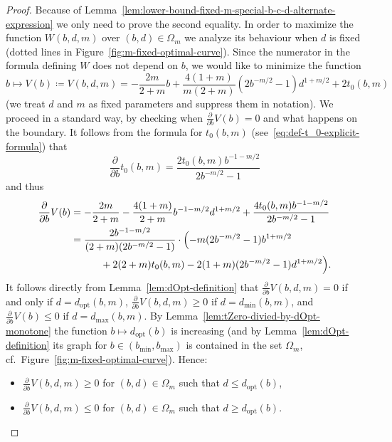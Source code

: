 \documentclass[a4paper]{amsart} %
\theoremstyle{definition}
\theoremstyle{remark}
\numberwithin{equation}{section}
\newcommand*{\specialbd}[1]{\Omega_{#1}}
\newcommand*{\XXXspecialbd}{W}
\newcommand*{\XXXspecialbdDenominator}{V}
\newcommand*{\bMin}{b_{\min}}
\newcommand*{\bMax}{b_{\max}}
\newcommand*{\dMin}{d_{\min}}
\newcommand*{\dMax}{d_{\max}}
\newcommand*{\dOpt}{d_{\mathrm{opt}}}
\begin{document}
\begin{proof}%
	Because of Lemma~\ref{lem:lower-bound-fixed-m-special-b-c-d-alternate-expression}
	we only need to prove the second equality.
	In order to maximize the function $\XXXspecialbd(b,d,m)$
	over $(b,d) \in \specialbd{m}$
	we analyze its behaviour when $d$ is fixed
	(dotted lines in Figure~\ref{fig:m-fixed-optimal-curve}).
	Since the numerator in the formula defining $\XXXspecialbd$ does not depend on $b$,
	we would like to  minimize the function 
	\[
	b \mapsto \XXXspecialbdDenominator(b) \coloneqq \XXXspecialbdDenominator(b,d,m) = - \frac{2m}{2+m}b +
	\frac{4(1+m)}{m(2+m)}(2b^{-m/2}  -1)d^{1+m/2} 
	+2t_0(b,m)
	\]
	(we treat $d$ and $m$ as fixed parameters and suppress them in notation).
	We proceed in a standard way, by checking when $\frac{\partial }{\partial b} \XXXspecialbdDenominator(b) = 0$ and what happens on the boundary.
	It follows from the formula for $t_0(b,m)$ (see~\eqref{eq:def-t_0-explicit-formula})
	that
	\[
	\frac{\partial}{\partial b} t_0(b,m) = \frac{2t_0(b,m) b^{-1-m/2}}{2 b^{-m/2} -1 }
	\]
	and thus
	\begin{align*}
	\frac{\partial}{\partial b} \XXXspecialbdDenominator(b)
	&= - \frac{2m}{2+m}
	- \frac{4(1+m)}{2+m}b^{-1-m/2}  d^{1+m/2} 
	+\frac{4t_0(b,m) b^{-1-m/2}}{2 b^{-m/2} -1 }\\
	&=   \frac{2b^{-1-m/2} 
	}{(2+m)(2 b^{-m/2} -1)}
	\cdot
	\Bigl( 
	-m(2 b^{-m/2} -1)b^{1+m/2} \\
	&\qquad\quad +2(2+m) t_0(b,m) - 2(1+m)(2 b^{-m/2} -1)d^{1+m/2}	\Bigr).
	\end{align*}		
	It follows directly from Lemma~\ref{lem:dOpt-definition} that
	$\frac{\partial }{\partial b} \XXXspecialbdDenominator(b,d,m) =0 $ if and only if  $d=\dOpt(b,m)$,
	$\frac{\partial }{\partial b} \XXXspecialbdDenominator(b,d,m) \geq 0$
	if $d = \dMin(b,m)$,
	and $\frac{\partial }{\partial b} \XXXspecialbdDenominator(b) \leq 0$
	if $d = \dMax(b,m)$.
	By Lemma~\ref{lem:tZero-divied-by-dOpt-monotone} 
	the function
	$b\mapsto \dOpt(b)$ is increasing 
	(and by Lemma~\ref{lem:dOpt-definition} its graph for $b\in(\bMin, \bMax)$ is contained in the set $\specialbd{m}$, cf.\ Figure~\ref{fig:m-fixed-optimal-curve}).
	Hence:
	\begin{itemize}
		\item $ \frac{\partial }{\partial b} \XXXspecialbdDenominator(b,d,m) \geq 0$ for $(b,d)\in\specialbd{m}$ 
		such that $d \leq \dOpt(b)$,
		\item $ \frac{\partial }{\partial b} \XXXspecialbdDenominator(b,d,m) \leq 0$ for $(b,d)\in\specialbd{m}$  such that $d \geq \dOpt(b)$.
	\end{itemize}
	

\end{proof}
\end{document}
